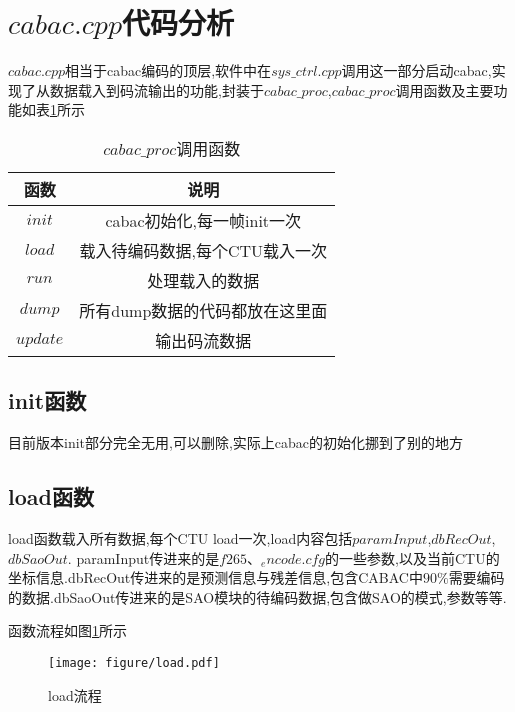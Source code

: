 \documentclass[UTF8,a4paper,12pt]{ctexart}
\newcommand{\wuhao}{\fontsize{10.5pt}{10.5pt}\selectfont}
\begin{document}
\thispagestyle{empty}       %
\newpage                    %
\tableofcontents\thispagestyle{empty}
\newpage
\setcounter{page}{1}        %
 
 
\section{$cabac.cpp$代码分析}
$cabac.cpp$相当于cabac编码的顶层,软件中在$sys\_ctrl.cpp$调用这一部分启动cabac,实现了从数据载入到码流输出的功能,封装于$cabac\_proc$,$cabac\_proc$调用函数及主要功能如表\ref{tab1}所示
\begin{table}[H] \wuhao             %
   \centering
  \caption{$cabac\_proc$调用函数}\label{tab1}
  \begin{tabular}{c|c}
    \toprule                  %
    函数 & 说明 \\
    \hline                  %
    $init$ & cabac初始化,每一帧init一次 \\
    $load$ & 载入待编码数据,每个CTU载入一次 \\
    $run$ & 处理载入的数据 \\
    $dump$ & 所有dump数据的代码都放在这里面 \\
    $update$ & 输出码流数据 \\
    \bottomrule                %
  \end{tabular}
\end{table}

\subsection{init函数}
目前版本init部分完全无用,可以删除,实际上cabac的初始化挪到了别的地方

\subsection{load函数}
load函数载入所有数据,每个CTU load一次,load内容包括$paramInput$,$dbRecOut$, \\
$dbSaoOut$. paramInput传进来的是$f265、_encode.cfg$的一些参数,以及当前CTU的坐标信息.dbRecOut传进来的是预测信息与残差信息,包含CABAC中$90\%$需要编码的数据.dbSaoOut传进来的是SAO模块的待编码数据,包含做SAO的模式,参数等等.

函数流程如图\ref{fig1}所示
\begin{figure}[H]
\centering
\texttt{[image: figure/load.pdf]}
\caption{load流程}\label{fig1}
\end{figure}
\end{document}
